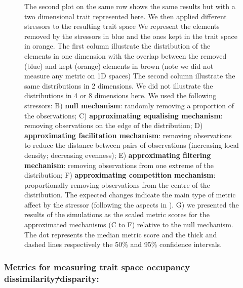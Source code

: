 \documentclass[12pt,letterpaper]{article}
\providecommand{\DIFaddtex}[1]{{\protect\color{blue}\uwave{#1}}} %
\providecommand{\DIFdeltex}[1]{{\protect\color{red}\sout{#1}}}                      %
\providecommand{\DIFaddbegin}{} %
\providecommand{\DIFaddend}{} %
\providecommand{\DIFdelbegin}{} %
\providecommand{\DIFdelend}{} %
\providecommand{\DIFaddendFL}{} %
\providecommand{\DIFadd}[1]{\texorpdfstring{\DIFaddtex{#1}}{#1}} %
\providecommand{\DIFdel}[1]{\texorpdfstring{\DIFdeltex{#1}}{}} %
\newcommand{\DIFscaledelfig}{0.5}
\newlength{\DIFdelgraphicswidth} %
\newlength{\DIFdelgraphicsheight} %
\newcommand{\DIFaddincludegraphics}[2][]{{\color{blue}\fbox{\DIFOincludegraphics[#1]{#2}}}} %
\newcommand{\DIFdelincludegraphics}[2][]{%
\sbox{\DIFdelgraphicsbox}{\DIFOincludegraphics[#1]{#2}}%
\settoboxwidth{\DIFdelgraphicswidth}{\DIFdelgraphicsbox} %
\settoboxtotalheight{\DIFdelgraphicsheight}{\DIFdelgraphicsbox} %
\scalebox{\DIFscaledelfig}{%
\parbox[b]{\DIFdelgraphicswidth}{\usebox{\DIFdelgraphicsbox}\\[-\baselineskip] \rule{\DIFdelgraphicswidth}{0em}}\llap{\resizebox{\DIFdelgraphicswidth}{\DIFdelgraphicsheight}{%
\setlength{\unitlength}{\DIFdelgraphicswidth}%
\begin{picture}(1,1)%
\thicklines\linethickness{2pt} %
{\color[rgb]{1,0,0}\put(0,0){\framebox(1,1){}}}%
{\color[rgb]{1,0,0}\put(0,0){\line( 1,1){1}}}%
{\color[rgb]{1,0,0}\put(0,1){\line(1,-1){1}}}%
\end{picture}%
}\hspace*{3pt}}} %
} %
\DeclareRobustCommand{\DIFaddbegin}{\DIFOaddbegin \let\includegraphics\DIFaddincludegraphics} %
\DeclareRobustCommand{\DIFaddend}{\DIFOaddend \let\includegraphics\DIFOincludegraphics} %
\DeclareRobustCommand{\DIFdelbegin}{\DIFOdelbegin \let\includegraphics\DIFdelincludegraphics} %
\DeclareRobustCommand{\DIFdelend}{\DIFOaddend \let\includegraphics\DIFOincludegraphics} %
\DeclareRobustCommand{\DIFaddendFL}{\DIFOaddendFL \let\includegraphics\DIFOincludegraphics} %
\begin{document}
\begin{figure}[!htbp]
{{The second plot on the same row shows the same results but with a two dimensional trait represented here.
We then applied different stressors to the resulting trait space
We represent the elements removed by the stressors in blue and the ones kept in the trait space in orange.
The first column illustrate the distribution of the elements in one dimension with the overlap between the removed (blue) and kept (orange) elements in brown (note we did not measure any metric on 1D spaces)
The second column illustrate the same distributions in 2 dimensions.
We did not illustrate the distributions in 4 or 8 dimensions here.
We used the following stressors:
B) \textbf{null mechanism}: randomly removing a proportion of the observations;
C) \textbf{approximating equalising mechanism}: removing observations on the edge of the distribution;
D) \textbf{approximating facilitation mechanism}: removing observations to reduce the distance between pairs of observations (increasing local density; decreasing evenness);
E) \textbf{approximating filtering mechanism}: removing observations from one extreme of the distribution;
F) \textbf{approximating competition mechanism}: proportionally removing observations from the centre of the distribution.
The expected changes indicate the main type of metric affect by the stressor (following the aspects in \citealt{mammola2021concepts}).
G) we presented the results of the simulations as the scaled metric scores for the approximated mechanisms (C to F) relative to the null mechanism. The dot represents the median metric score and the thick and dashed lines respectively the 50\% and 95\% confidence intervals.}\DIFaddendFL }
\label{Fig:simulations}
\end{figure}
\bigskip

\subsubsection{Metrics for measuring trait space occupancy \DIFaddbegin \DIFadd{(}\textit{\DIFadd{aka}} \DIFadd{functional diversity, }\DIFaddend dissimilarity\DIFdelbegin \DIFdel{/}\DIFdelend \DIFaddbegin \DIFadd{, }\DIFaddend disparity\DIFaddbegin \DIFadd{)}\DIFaddend :}
\end{document}

